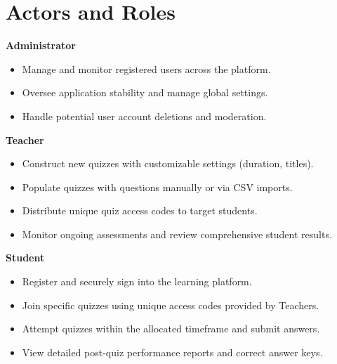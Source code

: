 \section{Actors and Roles}

\textbf{Administrator}
\begin{itemize}
\item Manage and monitor registered users across the platform.
\item Oversee application stability and manage global settings.
\item Handle potential user account deletions and moderation.
\end{itemize}

\textbf{Teacher}
\begin{itemize}
\item Construct new quizzes with customizable settings (duration, titles).
\item Populate quizzes with questions manually or via CSV imports.
\item Distribute unique quiz access codes to target students.
\item Monitor ongoing assessments and review comprehensive student results.
\end{itemize}

\textbf{Student}
\begin{itemize}
\item Register and securely sign into the learning platform.
\item Join specific quizzes using unique access codes provided by Teachers.
\item Attempt quizzes within the allocated timeframe and submit answers.
\item View detailed post-quiz performance reports and correct answer keys.
\end{itemize}
